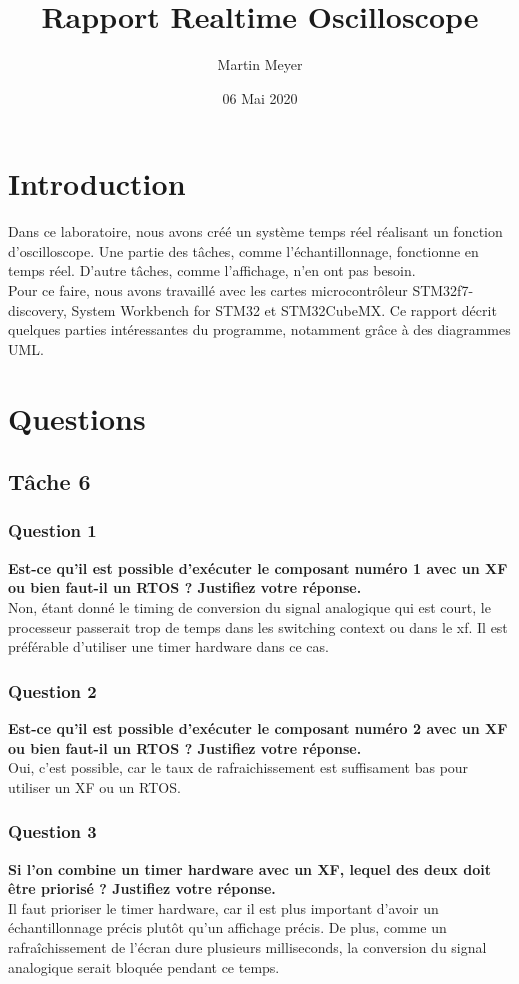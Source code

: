\documentclass[12pt]{article}
\title{Rapport Realtime Oscilloscope}
\author{Martin Meyer}
\date{06 Mai 2020}
\begin{document}
	\maketitle
	
	\tableofcontents

	\section{Introduction}
	Dans ce laboratoire, nous avons créé un système temps réel réalisant un fonction d'oscilloscope. Une partie des tâches, comme l'échantillonnage, fonctionne en temps réel. D'autre tâches, comme l'affichage, n'en ont pas besoin.\\
	Pour ce faire, nous avons travaillé avec les cartes microcontrôleur STM32f7-discovery, System Workbench for STM32 et STM32CubeMX.\newline
	Ce rapport décrit quelques parties intéressantes du programme, notamment grâce à des diagrammes UML.
	\section{Questions}
	\subsection{Tâche 6}
	\subsubsection{Question 1}
	\textbf{Est-ce qu'il est possible d'exécuter le composant numéro 1 avec un XF ou bien faut-il un RTOS ? Justifiez votre réponse.}\\
	Non, étant donné le timing de conversion du signal analogique qui est court, le processeur passerait trop de temps dans les switching context ou dans le xf. Il est préférable d'utiliser une timer hardware dans ce cas.
	\subsubsection{Question 2}
	\textbf{Est-ce qu'il est possible d'exécuter le composant numéro 2 avec un XF ou bien faut-il un RTOS ? Justifiez votre réponse.}\\
	Oui, c'est possible, car le taux de rafraichissement est suffisament bas pour utiliser un XF ou un RTOS.
	\subsubsection{Question 3}
	\textbf{Si l'on combine un timer hardware avec un XF, lequel des deux doit être priorisé ? Justifiez votre réponse.}\\
	Il faut prioriser le timer hardware, car il est plus important d'avoir un échantillonnage précis plutôt qu'un affichage précis. De plus, comme un rafraîchissement de l'écran dure plusieurs milliseconds, la conversion du signal analogique serait bloquée pendant ce temps.
	
\end{document}
